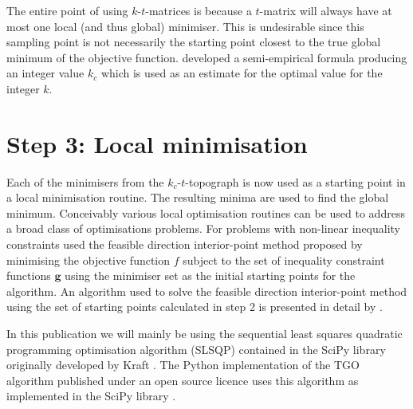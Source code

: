 %
The entire point of using $k$-$t$-matrices is because a $t$-matrix will always have at most one local (and thus global) minimiser. This is undesirable since this sampling point is not necessarily the starting point closest to the true global minimum of the objective function. \citet{Henderson2015} developed a semi-empirical formula producing an integer value $k_c$ which is used as an estimate for the optimal value for the integer $k$.
 
 
\section{Step 3: Local minimisation} \label{sec:tgo3}
Each of the minimisers from the  $k_c$-$t$-topograph is now used as a starting point in a local minimisation routine. The resulting minima are used to find the global minimum. Conceivably various local optimisation routines can be used to address a broad class of optimisations problems. For problems with non-linear inequality constraints \citet{Henderson2015} used the feasible direction interior-point method proposed by \citet{Herskovits1998} minimising the objective function $f$ subject to the set of inequality constraint functions $\mathbf{g}$ using the minimiser set as the initial starting points for the algorithm. An algorithm used to solve the feasible direction interior-point method using the set of starting points calculated in step 2 is presented in detail by \citet{Henderson2015}. 

In this publication we will mainly be using the sequential least squares quadratic programming optimisation algorithm (SLSQP) contained in the SciPy library originally developed by Kraft \cite{Kraft1988, Kraft1994}. The Python implementation of the TGO algorithm published under an open source licence uses this algorithm as implemented in the SciPy library \cite{TGOpy, scipy}.
